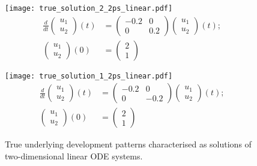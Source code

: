 \begin{figure}
	\centering
	\begin{minipage}{.5\linewidth}
		\centering
		\texttt{[image: true\_solution\_2\_2ps\_linear.pdf]}
		\scriptsize
		\begin{equation}\label{eq:ODE-systems-2ps-linear1}
		\begin{split}
		\frac{d}{dt}\begin{pmatrix} u_1 \\ u_2 \end{pmatrix}(t) &= \begin{pmatrix} -0.2 & 0 \\ 0 & 0.2 \end{pmatrix} \begin{pmatrix} u_1 \\ u_2 \end{pmatrix}(t); \\
		\begin{pmatrix} u_1 \\ u_2 \end{pmatrix}(0) &= \begin{pmatrix} 2 \\ 1 \end{pmatrix}
		\end{split}
		\end{equation}
		\normalsize
	\end{minipage}\begin{minipage}{.5\linewidth}
		\centering
		\texttt{[image: true\_solution\_1\_2ps\_linear.pdf]}
		\scriptsize		
		\begin{equation}\label{eq:ODE-systems-2ps-linear2}
		\begin{split}
			\frac{d}{dt}\begin{pmatrix} u_1 \\ u_2 \end{pmatrix}(t) &= \begin{pmatrix} -0.2 & 0 \\ 0 & -0.2 \end{pmatrix} \begin{pmatrix} u_1 \\ u_2 \end{pmatrix}(t); \\
			\begin{pmatrix} u_1 \\ u_2 \end{pmatrix}(0) &= \begin{pmatrix} 2 \\ 1 \end{pmatrix}
		\end{split}
		\end{equation}
		\normalsize
	\end{minipage}
	\caption{True underlying development patterns characterised as solutions of two-dimensional linear ODE systems.}
	\label{fig:true_solution_linear_2ps}
\end{figure}

